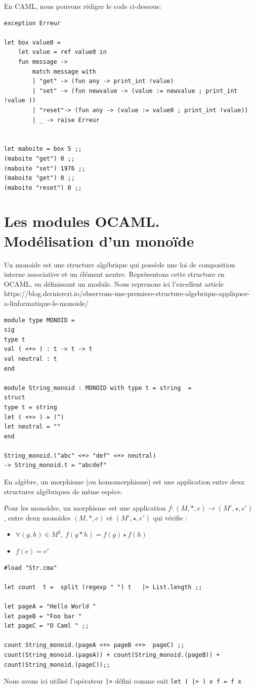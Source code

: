 \documentclass[11pt]{book}
\begin{document}
En CAML, nous pouvons rédiger le code ci-dessous:
\begin{Verbatim}
exception Erreur

let box value0 =
	let value = ref value0 in
	fun message ->
		match message with
		| "get" -> (fun any -> print_int !value)
		| "set" -> (fun newvalue -> (value := newvalue ; print_int !value ))
		| "reset"-> (fun any -> (value := value0 ; print_int !value))
		| _ -> raise Erreur
		
		
let maboite = box 5 ;;
(maboite "get") 0 ;;
(maboite "set") 1976 ;;
(maboite "get") 0 ;;
(maboite "reset") 0 ;;
\end{Verbatim}

\section{Les modules OCAML. Modélisation d'un monoïde}
Un monoïde est une structure algébrique qui possède une loi de composition
interne associative et un élément neutre.
Représentons cette structure en OCAML, en définissant un module.
Nous reprenons ici l'excellent article 
https://blog.derniercri.io/observons-une-premiere-structure-algebrique-appliquee-a-linformatique-le-monoide/
\begin{Verbatim}
module type MONOID =
sig
type t
val ( <+> ) : t -> t -> t
val neutral : t	
end

module String_monoid : MONOID with type t = string  =
struct
type t = string
let ( <+> ) = (^)
let neutral = ""
end

String_monoid.("abc" <+> "def" <+> neutral)
-> String_monoid.t = "abcdef"	
\end{Verbatim}

En algèbre, un morphisme (ou homomorphisme) est une application entre deux structures algébriques
de même espèce.

Pour les  monoïdes, un morphisme est une application 
$f:(M,*,e)\longrightarrow (M',\star ,e')$ , entre deux monoïdes $ (M,*,e)$ et 
$(M',\star , e')$ qui vérifie :
\begin{itemize}
	\item $\forall (g,h)\in M^{2},~f(g*h)=f(g)\star f(h)$
	\item $f(e)=e'$
\end{itemize}
\begin{Verbatim}
#load "Str.cma"

let count  t =  split (regexp " ") t   |> List.length ;;

let pageA = "Hello World "
let pageB = "Foo bar "
let pageC = "O Caml " ;;

count String_monoid.(pageA <+> pageB <+>  pageC) ;;
count(String_monoid.(pageA)) + count(String_monoid.(pageB)) + count(String_monoid.(pageC));;
\end{Verbatim}
Nous avons ici utilisé l'opérateur \verb+|>+ défini comme suit \verb+let ( |> ) x f = f x+
\end{document}
